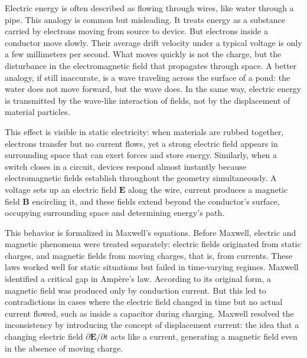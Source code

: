 Electric energy is often described as flowing through wires, like water through a pipe. This analogy is common but misleading. It treats energy as a substance carried by electrons moving from source to device. But electrons inside a conductor move slowly. Their average drift velocity under a typical voltage is only a few millimeters per second. What moves quickly is not the charge, but the disturbance in the electromagnetic field that propagates through space. A better analogy, if still inaccurate, is a wave traveling across the surface of a pond: the water does not move forward, but the wave does. In the same way, electric energy is transmitted by the wave-like interaction of fields, not by the displacement of material particles.

This effect is visible in static electricity: when materials are rubbed together, electrons transfer but no current flows, yet a strong electric field appears in surrounding space that can exert forces and store energy. Similarly, when a switch closes in a circuit, devices respond almost instantly because electromagnetic fields establish throughout the geometry simultaneously. A voltage sets up an electric field $\mathbf{E}$ along the wire, current produces a magnetic field $\mathbf{B}$ encircling it, and these fields extend beyond the conductor's surface, occupying surrounding space and determining energy's path.

This behavior is formalized in Maxwell's equations. Before Maxwell, electric and magnetic phenomena were treated separately: electric fields originated from static charges, and magnetic fields from moving charges, that is, from currents. These laws worked well for static situations but failed in time-varying regimes. Maxwell identified a critical gap in Ampère's law. According to its original form, a magnetic field was produced only by conduction current. But this led to contradictions in cases where the electric field changed in time but no actual current flowed, such as inside a capacitor during charging. Maxwell resolved the inconsistency by introducing the concept of displacement current: the idea that a changing electric field $\partial \mathbf{E}/\partial t$ acts like a current, generating a magnetic field even in the absence of moving charge.

